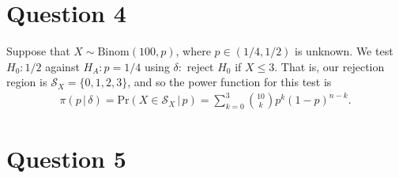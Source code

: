 \documentclass[10pt]{article}
\begin{document}
\section{Question 4} \noindent
Suppose that \(X \sim \mathrm{Binom}(100, p)\), where \(p \in (1/4, 1/2)\) is unknown. We test \(H_0 : 1/2\) against \(H_A : p = 1/4\) using \(\delta :\) 
reject \(H_0\) if \(X \le 3\). That is, our rejection region is \(\mathcal{S}_X = \{0,1,2,3\}\), and so the power function for this test is 
\begin{align*}
    \pi(p \,|\, \delta)
    = \mathrm{Pr}(X \in \mathcal{S}_X \,|\, p)
    = \sum_{k=0}^3 \binom{10}{k} p^k (1 - p)^{n - k}.
\end{align*}

\section{Question 5} \noindent


\end{document}
